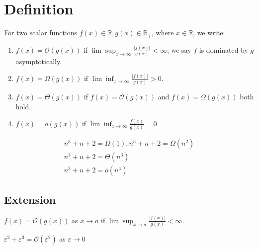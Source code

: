 \documentclass[11pt]{elegantbook}
\begin{document}
\section{Definition}
\begin{center}
\end{center}
For two scalar functions $f(x)\in \mathbb{R}, g(x)\in \mathbb{R}_+$, where $x\in \mathbb{R}$, we write:
\begin{enumerate}
    \item $f(x)=\mathcal{O}(g(x))$ if $\lim \sup_{x \rightarrow	\infty}\frac{|f(x)|}{g(x)}<\infty$; we say $f$ is dominated by $g$ asymptotically.
    \item $f(x)=\Omega(g(x))$ if $\lim \inf_{x \rightarrow \infty}\frac{|f(x)|}{g(x)}>0$.
    \item $f(x)=\Theta (g(x))$ if $f(x)=\mathcal{O}(g(x))$ and $f(x)=\Omega(g(x))$ both hold.
    \item $f(x)=o(g(x))$ if $\lim \inf_{x \rightarrow \infty}\frac{f(x)}{g(x)}=0$.
\end{enumerate}

\begin{example}
\begin{equation}
    \begin{aligned}
        n^3+n+2=\Omega(1),n^3+n+2=\Omega(n^2)\\
        n^3+n+2=\Theta(n^3)\\
        n^3+n+2=o(n^4)
    \end{aligned}
    \nonumber
\end{equation}
\end{example}

\subsection{Extension}
$f(x)=\mathcal{O}(g(x))$ as $x \rightarrow a$ if $\lim \sup_{x \rightarrow a}\frac{|f(x)|}{g(x)}<\infty$.

\begin{example}
$\varepsilon^2+\varepsilon^3=\mathcal{O}(\varepsilon^2)$ as $\varepsilon \rightarrow 0$
\end{example}
\end{document}
